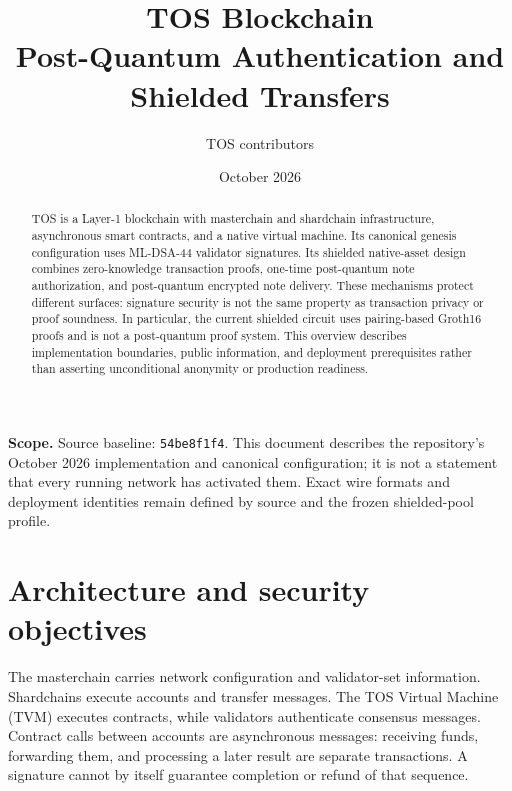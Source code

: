 \documentclass[11pt,a4paper]{article}
\title{TOS Blockchain\\\large Post-Quantum Authentication and Shielded Transfers}
\author{TOS contributors}
\date{October 2026}
\newcommand{\code}[1]{\texttt{#1}}
\begin{document}
\maketitle
\begin{abstract}
TOS is a Layer-1 blockchain with masterchain and shardchain infrastructure,
asynchronous smart contracts, and a native virtual machine. Its canonical
genesis configuration uses ML-DSA-44 validator signatures. Its shielded
native-asset design combines zero-knowledge transaction proofs, one-time
post-quantum note authorization, and post-quantum encrypted note delivery.
These mechanisms protect different surfaces: signature security is not the
same property as transaction privacy or proof soundness. In particular, the
current shielded circuit uses pairing-based Groth16 proofs and is not a
post-quantum proof system. This overview describes implementation boundaries,
public information, and deployment prerequisites rather than asserting
unconditional anonymity or production readiness.
\end{abstract}
\textbf{Scope.} Source baseline: \code{54be8f1f4}. This document describes the
repository's October 2026 implementation and canonical configuration; it is
not a statement that every running network has activated them. Exact wire
formats and deployment identities remain defined by source and the frozen
shielded-pool profile.
\setcounter{tocdepth}{1}
\tableofcontents
\newpage

\section{Architecture and security objectives}
The masterchain carries network configuration and validator-set information.
Shardchains execute accounts and transfer messages. The TOS Virtual Machine
(TVM) executes contracts, while validators authenticate consensus messages.
Contract calls between accounts are asynchronous messages: receiving funds,
forwarding them, and processing a later result are separate transactions.
A signature cannot by itself guarantee completion or refund of that sequence.
\end{document}
